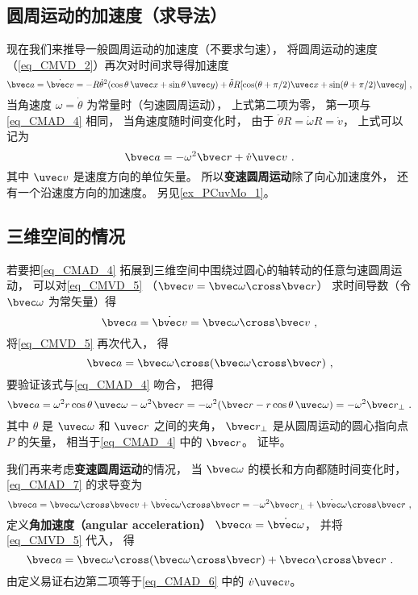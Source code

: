 \subsection{圆周运动的加速度（求导法）}\label{sub_CMAD_1}
现在我们来推导一般圆周运动的加速度（不要求匀速），  将圆周运动的速度（\autoref{eq_CMVD_2}）再次对时间求导得加速度
\begin{equation}
\bvec a = \dot {\bvec v} =  - R \dot\theta^2(\cos \theta\, \uvec x + \sin \theta\, \uvec y) + \ddot\theta R [\cos(\theta + \pi/2) \uvec x + \sin(\theta + \pi/2)\uvec y]~,
\end{equation}
当角速度 $\omega = \dot\theta$ 为常量时（匀速圆周运动）， 上式第二项为零， 第一项与\autoref{eq_CMAD_4} 相同， 当角速度随时间变化时， 由于 $\ddot\theta R = \dot\omega R = \dot v$， 上式可以记为
\begin{equation}\label{eq_CMAD_6}
\bvec a = - \omega ^2 \bvec r + \dot v \uvec v~.
\end{equation}
其中 $\uvec v$ 是速度方向的单位矢量。 所以\textbf{变速圆周运动}除了向心加速度外， 还有一个沿速度方向的加速度。 另见\autoref{ex_PCuvMo_1}。

\subsection{三维空间的情况}
若要把\autoref{eq_CMAD_4} 拓展到三维空间中围绕过圆心的轴转动的任意匀速圆周运动， 可以对\autoref{eq_CMVD_5}  （$\bvec v = \bvec\omega \cross \bvec r$） 求时间导数（令 $\bvec\omega$ 为常矢量）得
\begin{equation}\label{eq_CMAD_7}
\bvec a = \dot{\bvec v} = \bvec\omega \cross \bvec v~,
\end{equation}
将\autoref{eq_CMVD_5}  再次代入， 得
\begin{equation}\label{eq_CMAD_9}
\bvec a =  \bvec\omega \cross (\bvec\omega \cross \bvec r)~,
\end{equation}
要验证该式与\autoref{eq_CMAD_4} 吻合， 把得
\begin{equation}
\bvec a = \omega^2 r \cos\theta\, \uvec \omega - \omega^2 \bvec r = -\omega^2 (\bvec r - r\cos\theta\, \uvec\omega) = -\omega^2 \bvec r_\bot~.
\end{equation}
其中 $\theta$ 是 $\uvec\omega$ 和 $\uvec r$ 之间的夹角， $\bvec r_\bot$ 是从圆周运动的圆心指向点 $P$ 的矢量， 相当于\autoref{eq_CMAD_4} 中的 $\bvec r$。 证毕。

我们再来考虑\textbf{变速圆周运动}的情况， 当 $\bvec\omega$ 的模长和方向都随时间变化时， \autoref{eq_CMAD_7} 的求导变为
\begin{equation}
\bvec a = \bvec\omega \cross \bvec v + \dot{\bvec\omega} \cross \bvec r = -\omega^2 \bvec r_\bot + \dot{\bvec\omega} \cross \bvec r~,
\end{equation}
定义\textbf{角加速度（angular acceleration）} $\bvec\alpha = \dot{\bvec\omega}$， 并将\autoref{eq_CMVD_5}  代入， 得
\begin{equation}\label{eq_CMAD_1}
\bvec a =  \bvec\omega \cross (\bvec\omega \cross \bvec r) + \bvec\alpha\cross\bvec r~.
\end{equation}
由定义易证右边第二项等于\autoref{eq_CMAD_6} 中的 $\dot v\uvec v$。
